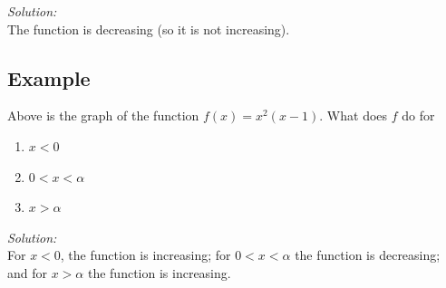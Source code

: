 \noindent \textit{Solution:} \\
The function is decreasing (so it is not increasing).

\subsection{Example} \label{ex12.1}
\begin{center}
\end{center}
Above is the graph of the function $f(x) = x^2(x-1)$. What does $f$ do for
\begin{enumerate}
	\item $x < 0$
	\item $0 < x < \alpha$
	\item $x > \alpha$
\end{enumerate}
\noindent \textit{Solution:} \\
For $x < 0$, the function is increasing; for $0 < x < \alpha$ the function is decreasing; and for $x > \alpha$ the function is increasing.

